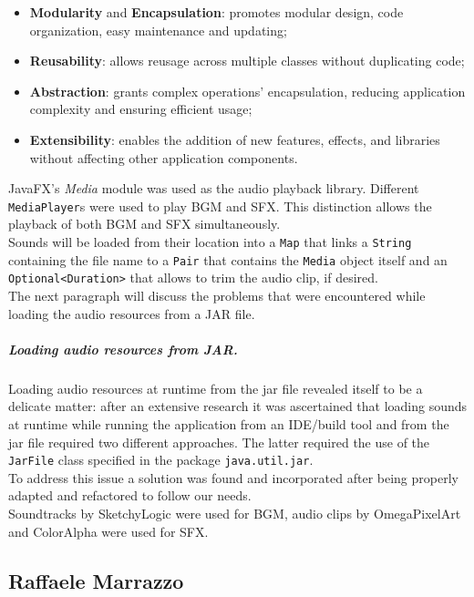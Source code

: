 \documentclass[12pt, a4paper]{report}
\theoremstyle{definition}
\begin{document}
    \begin{itemize}
        \item \textbf{Modularity} and \textbf{Encapsulation}: promotes modular design, code organization, easy maintenance and updating;
        \item \textbf{Reusability}: allows reusage across multiple classes without duplicating code;
        \item \textbf{Abstraction}: grants complex operations' encapsulation, reducing application complexity and ensuring efficient usage;
        \item \textbf{Extensibility}: enables the addition of new features, effects, and libraries without affecting other application components.
    \end{itemize}

    JavaFX's \textit{Media} module was used as the audio playback library. Different \verb|MediaPlayer|s were used to play BGM and SFX.
    This distinction allows the playback of both BGM and SFX simultaneously.\\
    Sounds will be loaded from their location into a \verb|Map| that links a \verb|String| containing the file name to a \verb|Pair| that contains the
    \verb|Media| object itself and an \verb|Optional<Duration>| that allows to trim the audio clip, if desired.\\
    The next paragraph will discuss the problems that were encountered while loading the audio resources from a JAR file.

    \subparagraph{Loading audio resources from JAR.}
    Loading audio resources at runtime from the jar file revealed itself to be a delicate matter: after an extensive research it was ascertained that loading
    sounds at runtime while running the application from an IDE/build tool and from the jar file required two different approaches. The latter required the use
    of the \verb|JarFile| class specified in the package \verb|java.util.jar|.\\
    To address this issue a solution \cite{jarFile} was found and incorporated after being properly adapted and refactored to follow our needs.\\
    Soundtracks by SketchyLogic \cite{bgm} were used for BGM, audio clips by OmegaPixelArt \cite{sfxGB} and ColorAlpha \cite{sfxMenu} were used for SFX.

    \subsection*{Raffaele Marrazzo}
\end{document}
